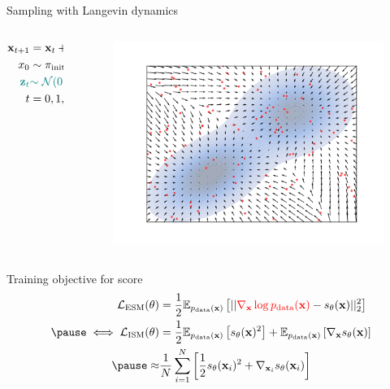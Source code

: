 \documentclass[aspectratio=169,xcolor=dvipsnames]{beamer}
\newcommand{\bx}{\mathbf{x}}
\newcommand{\nbx}{\nabla_{\bx}}
\begin{document}
\begin{frame}{Sampling with Langevin dynamics}
  \begin{columns}
    \begin{column}{0.5\textwidth}
      \begin{align*}
        \bx_{t+1} &= \bx_{t} + \alpha \cdot s_\theta(\bx_t) + \textcolor{teal}{\alpha \epsilon \cdot \mathbf{z}_t} \\
        x_0 &\sim \pi_{\text{init}}\\
        \textcolor{teal}{\textbf{z}_t} &\textcolor{teal}{\sim \mathcal{N}(0, 1)}\\
        t &= 0, 1, \dots T \to \infty
      \end{align*}
    \end{column}
    \begin{column}{0.5\textwidth}
      \centering
      \begin{figure}
        \centering
        \includegraphics[width=\textwidth]{figs/gen/gaussian_mixture_score_init.png}
      \end{figure}
    \end{column}
  \end{columns}
\end{frame}

\begin{frame}{Training objective for score}
  \pause
\begin{align*}
      \mathcal{L}_\text{ESM} (\theta) &= \frac{1}{2}\mathbb{E}_{p_\text{data}(\bx)} \left[ || \textcolor{red}{\nbx \log p_\text{data}(\bx)} - s_\theta(\bx) ||_2^2\right]\\
      \pause
      \iff \mathcal{L}_\text{ISM}(\theta) &= \frac{1}{2}\mathbb{E}_{p_\text{data}(\bx)} \left[ s_\theta(\bx)^2\right] + \mathbb{E}_{p_\text{data}(\bx)}\left[\nbx s_\theta(\bx) \right]\\
      \pause
      \approx & \frac{1}{N} \sum\limits_{i=1}^{N}  \left[\frac{1}{2} s_\theta(\bx_i)^2 + \nabla_{\bx_i} s_\theta(\bx_i)  \right]
  \end{align*}
\end{frame}
\end{document}
